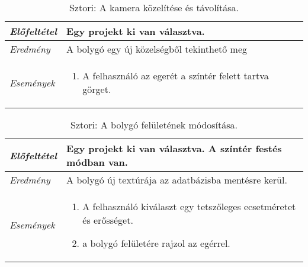 \begin{table}[H]
	\centering
	\begin{tabular}{ | m{} | m{} | }
		\hline
		\emph{Előfeltétel} & Egy projekt ki van választva. \\
		\hline
		\emph{Eredmény} & A bolygó egy új közelségből tekinthető meg \\
		\hline
		\hline
		\emph{Események} &

		\begin{enumerate}[itemsep=-1ex]
			\item A felhasználó az egerét a színtér felett tartva görget.
		\end{enumerate}
		\\
		\hline
	\end{tabular}
	\caption{Sztori: A kamera közelítése és távolítása.}
	\label{tab:story-planet-pan}
\end{table}

\begin{table}[H]
	\centering
	\begin{tabular}{ | m{} | m{} | }
		\hline
		\emph{Előfeltétel} & Egy projekt ki van választva. A színtér festés módban van. \\
		\hline
		\emph{Eredmény} & A bolygó új textúrája az adatbázisba mentésre kerül. \\
		\hline
		\hline
		\emph{Események} &

		\begin{enumerate}[itemsep=-1ex]
			\item A felhasználó kiválaszt egy tetszőleges ecsetméretet és erősséget.
			\item a bolygó felületére rajzol az egérrel.
		\end{enumerate}
		\\
		\hline
	\end{tabular}
	\caption{Sztori: A bolygó felületének módosítása.}
	\label{tab:story-terraforming}
\end{table}

